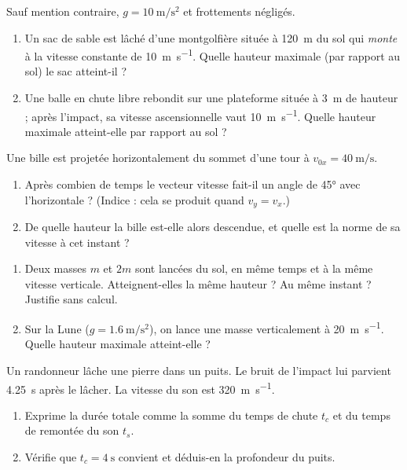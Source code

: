 \documentclass[11pt,a4paper]{article}
\begin{document}
Sauf mention contraire, $g=\qty{10}{\metre\per\second\squared}$ et frottements négligés.

\begin{exo}
\begin{enumerate}[label=\alph*)]
  \item Un sac de sable est lâché d'une montgolfière située à \qty{120}{\metre} du sol qui \emph{monte}
        à la vitesse constante de \qty{10}{\metre\per\second}. Quelle hauteur maximale (par rapport au sol) le sac atteint-il ?
  \item Une balle en chute libre rebondit sur une plateforme située à \qty{3}{\metre} de hauteur ; après
        l'impact, sa vitesse ascensionnelle vaut \qty{10}{\metre\per\second}. Quelle hauteur maximale atteint-elle par rapport au sol ?
\end{enumerate}
\end{exo}

\begin{exo}
Une bille est projetée horizontalement du sommet d'une tour à $v_{0x}=\qty{40}{\metre\per\second}$.
\begin{enumerate}[label=\alph*)]
  \item Après combien de temps le vecteur vitesse fait-il un angle de \ang{45} avec l'horizontale ?
        (Indice : cela se produit quand $v_y=v_x$.)
  \item De quelle hauteur la bille est-elle alors descendue, et quelle est la norme de sa vitesse à cet instant ?
\end{enumerate}
\end{exo}

\begin{exo}
\begin{enumerate}[label=\alph*)]
  \item Deux masses $m$ et $2m$ sont lancées du sol, en même temps et à la même vitesse verticale.
        Atteignent-elles la même hauteur ? Au même instant ? Justifie sans calcul.
  \item Sur la Lune ($g=\qty{1,6}{\metre\per\second\squared}$), on lance une masse verticalement à \qty{20}{\metre\per\second}. Quelle hauteur maximale atteint-elle ?
\end{enumerate}
\end{exo}

\begin{exo}
Un randonneur lâche une pierre dans un puits. Le bruit de l'impact lui parvient \qty{4,25}{\second}
après le lâcher. La vitesse du son est \qty{320}{\metre\per\second}.
\begin{enumerate}[label=\alph*)]
  \item Exprime la durée totale comme la somme du temps de chute $t_c$ et du temps de remontée du son $t_s$.
  \item Vérifie que $t_c=\qty{4}{\second}$ convient et déduis-en la profondeur du puits.
\end{enumerate}
\end{exo}
\end{document}

